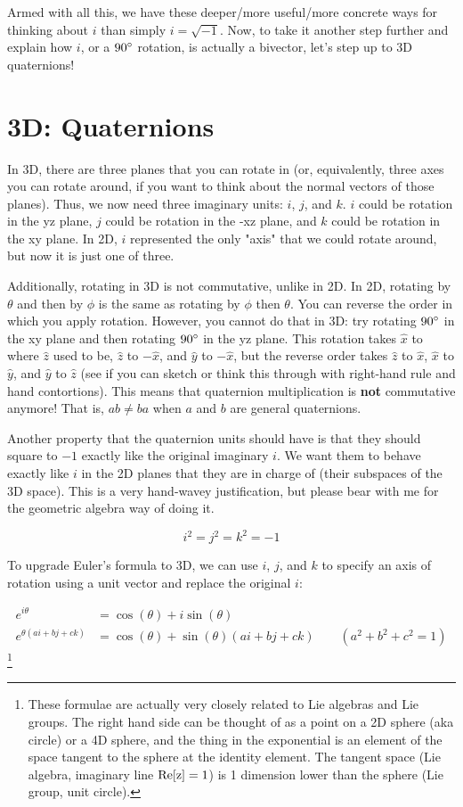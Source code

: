 \documentclass[12pt]{article}
\begin{document}
Armed with all this, we have these deeper/more useful/more concrete ways for thinking about $i$ than simply $i = \sqrt{-1}$. Now, to take it another step further and explain how $i$, or a $90\degree$ rotation, is actually a bivector, let's step up to 3D quaternions! 

\section{3D: Quaternions}
In 3D, there are three planes that you can rotate in (or, equivalently, three axes you can rotate around, if you want to think about the normal vectors of those planes). Thus, we now need three imaginary units: $i$, $j$, and $k$. $i$ could be rotation in the yz plane, $j$ could be rotation in the -xz plane, and $k$ could be rotation in the xy plane. In 2D, $i$ represented the only "axis" that we could rotate around, but now it is just one of three. 

Additionally, rotating in 3D is not commutative, unlike in 2D. In 2D, rotating by $\theta$ and then by $\phi$ is the same as rotating by $\phi$ then $\theta$. You can reverse the order in which you apply rotation. However, you cannot do that in 3D: try rotating $90\degree$ in the xy plane and then rotating $90\degree$ in the yz plane. This rotation takes $\hat{x}$ to where $\hat{z}$ used to be, $\hat{z}$ to $-\hat{x}$, and $\hat{y}$ to $-\hat{x}$, but the reverse order takes $\hat{z}$ to $\hat{x}$, $\hat{x}$ to $\hat{y}$, and $\hat{y}$ to $\hat{z}$ (see if you can sketch or think this through with right-hand rule and hand contortions). This means that quaternion multiplication is \textbf{not} commutative anymore! That is, $ab \ne ba$ when $a$ and $b$ are general quaternions. 

Another property that the quaternion units should have is that they should square to $-1$ exactly like the original imaginary $i$. We want them to behave exactly like $i$ in the 2D planes that they are in charge of (their subspaces of the 3D space). This is a very hand-wavey justification, but please bear with me for the geometric algebra way of doing it.

\[i^2=j^2=k^2=-1\]

To upgrade Euler's formula to 3D, we can use $i$, $j$, and $k$ to specify an axis of rotation using a unit vector and replace the original $i$:

\begin{align*}
e^{i\theta} &= \cos(\theta) + i \sin(\theta) \\
e^{\theta (a i + b j + c k)} &= \cos(\theta) + \sin(\theta) (a i + b j + c k) \qquad (a^2 + b^2 + c^2 = 1)
\end{align*}\footnote{These formulae are actually very closely related to Lie algebras and Lie groups. The right hand side can be thought of as a point on a 2D sphere (aka circle) or a 4D sphere, and the thing in the exponential is an element of the space tangent to the sphere at the identity element. The tangent space (Lie algebra, imaginary line $\rm{Re}[z]=1$) is 1 dimension lower than the sphere (Lie group, unit circle).}
\end{document}

